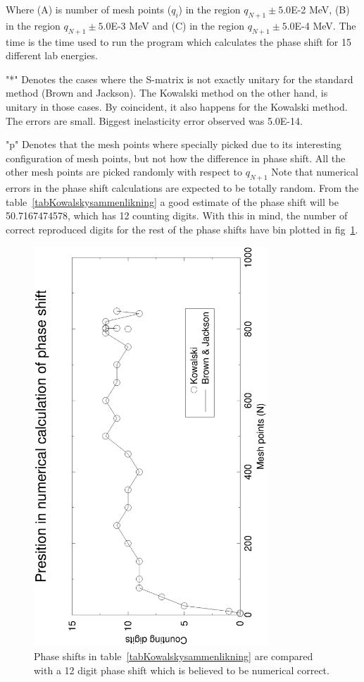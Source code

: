 Where (A) is number of mesh points ($q_i$) in the region $q_{N+1}\pm 5.0$E-2 MeV,
(B) in the region $q_{N+1}\pm5.0$E-3 MeV and (C) in the  region $q_{N+1}\pm 5.0$E-4 MeV.
The time is the time used to run the program which calculates the phase shift for 15 different lab energies.

"*" Denotes the cases where the S-matrix is not exactly unitary for the standard method (Brown and Jackson).
The Kowalski method on the other hand, is unitary in those cases. By coincident, it also happens for the Kowalski
method. The errors are small. Biggest inelasticity error observed was 5.0E-14. 

"p" Denotes that the mesh points where specially picked due to its interesting configuration of mesh points, but
not how the difference in phase shift.
All
the other mesh points are picked randomly with respect to $q_{N+1}$
\nl
Note that  numerical errors in the phase shift calculations are expected to be totally random. 
From the table~\ref{tabKowalskysammenlikning} a good estimate
of the phase shift will be 50.7167474578, which has 12 counting digits.
With this in mind, the number of correct reproduced digits for the rest of the phase shifts 
have bin plotted in fig~\ref{figtellenesiffeta}.
\begin{flushleft}
\begin{figure}
\centering
\includegraphics[height=15cm,angle=-90]{tellenesiffet.eps}
\caption{\label{figtellenesiffeta} Phase shifts in table~\ref{tabKowalskysammenlikning} 
are compared with a 12 digit phase shift which is
believed to be numerical correct.}
\end{figure}

\end{flushleft}



